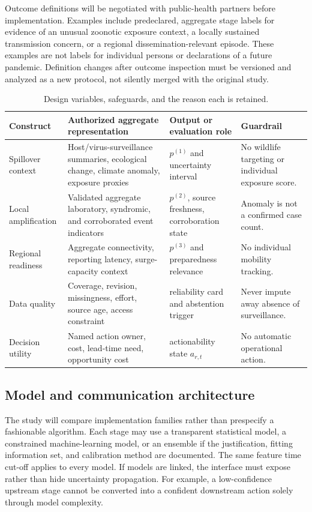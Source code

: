 \documentclass[conference]{IEEEtran}
\begin{document}
Outcome definitions will be negotiated with public-health partners before implementation. Examples include predeclared, aggregate stage labels for evidence of an unusual zoonotic exposure context, a locally sustained transmission concern, or a regional dissemination-relevant episode. These examples are not labels for individual persons or declarations of a future pandemic. Definition changes after outcome inspection must be versioned and analyzed as a new protocol, not silently merged with the original study.

\begin{table}[t]
\caption{Design variables, safeguards, and the reason each is retained.}
\label{tab:variables}
\centering
\renewcommand{\arraystretch}{1.15}
\begin{tabular}{|p{}|p{}|p{}|p{}|}
\hline
\textbf{Construct} & \textbf{Authorized aggregate representation} & \textbf{Output or evaluation role} & \textbf{Guardrail} \\
\hline
Spillover context & Host/virus-surveillance summaries, ecological change, climate anomaly, exposure proxies & $p^{(1)}$ and uncertainty interval & No wildlife targeting or individual exposure score. \\
\hline
Local amplification & Validated aggregate laboratory, syndromic, and corroborated event indicators & $p^{(2)}$, source freshness, corroboration state & Anomaly is not a confirmed case count. \\
\hline
Regional readiness & Aggregate connectivity, reporting latency, surge-capacity context & $p^{(3)}$ and preparedness relevance & No individual mobility tracking. \\
\hline
Data quality & Coverage, revision, missingness, effort, source age, access constraint & reliability card and abstention trigger & Never impute away absence of surveillance. \\
\hline
Decision utility & Named action owner, cost, lead-time need, opportunity cost & actionability state $a_{r,t}$ & No automatic operational action. \\
\hline
\end{tabular}
\end{table}

\subsection{Model and communication architecture}

The study will compare implementation families rather than prespecify a fashionable algorithm. Each stage may use a transparent statistical model, a constrained machine-learning model, or an ensemble if the justification, fitting information set, and calibration method are documented. The same feature time cut-off applies to every model. If models are linked, the interface must expose rather than hide uncertainty propagation. For example, a low-confidence upstream stage cannot be converted into a confident downstream action solely through model complexity.
\end{document}
